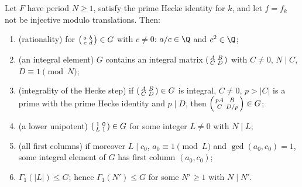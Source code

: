\begin{theorem}[Level]\label{ch19:thm:level}
Let $F$ have period $N\ge1$, satisfy the prime Hecke identity for $k$, and let $f=f_k$ not be injective modulo translations.  Then:
\begin{enumerate}[label=(\alph*)]
\item (rationality) for $\left(\begin{smallmatrix}a&b\\c&d\end{smallmatrix}\right)\in G$ with $c\ne0$: $a/c\in\Q$ and $c^2\in\Q$;
\item (an integral element) $G$ contains an integral matrix $\left(\begin{smallmatrix}A&B\\C&D\end{smallmatrix}\right)$ with $C\ne0$, $N\mid C$, $D\equiv1\pmod N$;
\item (integrality of the Hecke step) if $\left(\begin{smallmatrix}A&B\\C&D\end{smallmatrix}\right)\in G$ is integral, $C\ne0$, $p>|C|$ is a prime with the prime Hecke identity and
  $p\mid D$, then $\left(\begin{smallmatrix}pA&B\\C&D/p\end{smallmatrix}\right)\in G$;
\item (a lower unipotent) $\left(\begin{smallmatrix}1&0\\L&1\end{smallmatrix}\right)\in G$ for some integer $L\ne0$ with $N\mid L$;
\item (all first columns) if moreover $L\mid c_0$, $a_0\equiv1\pmod L$ and $\gcd(a_0,c_0)=1$, some integral element of $G$ has first column
  $(a_0,c_0)$;
\item $\Gamma_1(|L|)\le G$; hence $\Gamma_1(N')\le G$ for some $N'\ge1$ with $N\mid N'$.
\end{enumerate}
\end{theorem}
